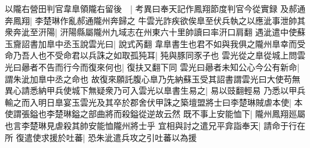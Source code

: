 以隴右營田判官韋臯領隴右留後　|{
	考異曰奉天記作鳳翔節度判官今從實録}
及郝通奔鳳翔|{
	李楚琳作亂郝通隴州奔歸之}
牛雲光詐疾欲俟臯至伏兵執之以應泚事泄帥其衆奔泚至汧陽|{
	汧陽縣屬隴州九域志在州東六十里帥讀曰率汧口肩翻}
遇泚遣中使蘇玉齎詔書加臯中丞玉說雲光曰|{
	說式芮翻}
韋臯書生也君不如與我俱之隴州臯幸而受命乃吾人也不受命君以兵誅之如取孤㹠耳|{
	㹠與豚同豕子也}
雲光從之臯從城上問雲光曰曏者不告而行今而復來何也|{
	復扶又翻下同}
雲光曰曏者未知公心今公有新命|{
	謂朱泚加臯中丞之命也}
故復來願託腹心臯乃先納蘇玉受其詔書謂雲光曰大使苟無異心請悉納甲兵使城下無疑衆乃可入雲光以臯書生易之|{
	易以豉翻輕易}
乃悉以甲兵輸之而入明日臯宴玉雲光及其卒於郡舍伏甲誅之築壇盟將士曰李楚琳賊虐本使|{
	本使謂張鎰也李楚琳鎰之部曲將而殺鎰從逆故云然}
既不事上安能恤下|{
	隴州鳳翔廵屬也言李楚琳見虐殺其帥安能恤隴州將士乎}
宜相與討之遣兄平弇詣奉天|{
	請命于行在所}
復遣使求援於吐蕃|{
	恐朱泚遣兵攻之引吐蕃以為援}


